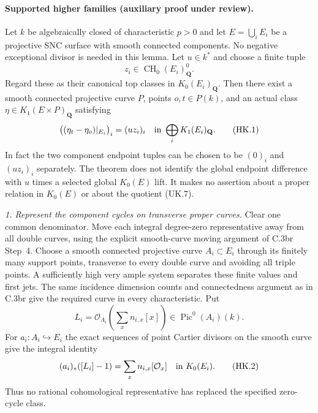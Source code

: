 \paragraph{Supported higher families (auxiliary proof under review).}
Let $k$ be algebraically closed of characteristic $p>0$ and let
$E=\bigcup_iE_i$ be a projective SNC surface with smooth connected
components. No negative exceptional divisor is needed in this lemma.
Let $u\in k^*$ and choose a finite tuple
\[
             z_i\in\operatorname{CH}_0(E_i)^0_{\mathbf Q}.
\]
Regard these as their canonical top classes in $K_0(E_i)_{\mathbf Q}$.
Then there exist a smooth connected projective curve $P$, points
$o,t\in P(k)$, and an actual class
$\eta\in K_1(E\times P)_{\mathbf Q}$ satisfying
\begin{equation}
 \bigl((\eta_t-\eta_o)|_{E_i}\bigr)_i=(u z_i)_i
                  \quad\hbox{in }\bigoplus_iK_1(E_i)_{\mathbf Q}.
                                                        \tag{HK.1}
\end{equation}
In fact the two component endpoint tuples can be chosen to be
$(0)_i$ and $(u z_i)_i$ separately. The theorem does not identify
the global endpoint difference with $u$ times a selected global
$K_0(E)$ lift. It makes no assertion about a proper relation in
$K_0(E)$ or about the quotient (UK.7).

\emph{1. Represent the component cycles on transverse proper curves.}
Clear one common denominator. Move each integral degree-zero
representative away from all double curves, using the explicit
smooth-curve moving argument of C.3br Step~4. Choose a smooth
connected projective curve $A_i\subset E_i$ through its finitely
many support points, transverse to every double curve and avoiding
all triple points. A sufficiently high very ample system separates
these finite values and first jets. The same incidence dimension
counts and connectedness argument as in C.3br give the required
curve in every characteristic. Put
\[
 L_i=\mathcal O_{A_i}\left(\sum_x n_{i,x}[x]\right)
                   \in\operatorname{Pic}^0(A_i)(k).
\]
For $a_i:A_i\hookrightarrow E_i$ the exact sequences of point
Cartier divisors on the smooth curve give the integral identity
\begin{equation}
              (a_i)_*([L_i]-1)=\sum_x n_{i,x}[\mathcal O_x]
                      \quad\hbox{in }K_0(E_i).          \tag{HK.2}
\end{equation}
Thus no rational cohomological representative has replaced the
specified zero-cycle class.

